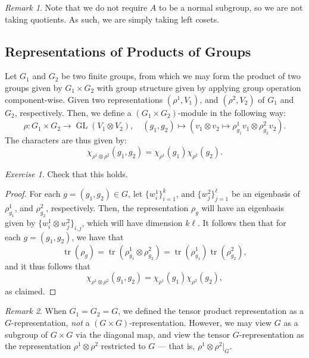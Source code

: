 \documentclass[a4paper]{report}
\theoremstyle{definition}
\theoremstyle{remark}
\newtheorem{remark}{Remark}
\theoremstyle{proposition}
\theoremstyle{conjecture}
\theoremstyle{lemma}
\theoremstyle{corollary}
\theoremstyle{exercise}
\newtheorem{exercise}{Exercise}
\theoremstyle{example}
\newcommand{\on}{\operatorname}
\begin{document}
\begin{remark}
    Note that we do not require $A$ to be a normal subgroup, so we are not
    taking quotients. As such, we are simply taking left cosets.
\end{remark}

\subsection{Representations of Products of Groups}

Let $G_1$ and $G_2$ be two finite groups, from which we may form the 
product of two groups given by $G_1 \times G_2$ with group 
structure given by applying group operation component-wise.
Given two representations $(\rho^1,V_1)$, and $(\rho^2,V_2)$ of 
$G_1$ and $G_2$, respectively. Then, we define a 
$(G_1\times G_2)$-module in the following way:
$$\rho : G_1\times G_2 \longrightarrow \on{GL}(V_1\otimes V_2), \quad (g_1,g_2)\longmapsto \left(v_1 \otimes v_2 \longmapsto \rho^1_{g_1}v_1 \otimes \rho^2_{g_2}v_2\right).$$
The characters are thus given by:
$$\chi_{\rho^1\otimes \rho^2}(g_1,g_2) = \chi_{\rho^1}(g_1) \chi_{\rho^2}(g_2).$$
\begin{exercise}
    Check that this holds.
\end{exercise}

\begin{proof}
    For each $g = (g_1,g_2) \in G$, let 
    $\lbrace w^1_i\rbrace_{i=1}^k$, and $\lbrace w^2_j\rbrace_{j=1}^\ell$ 
    be an eigenbasis of $\rho^1_{g_1}$, and $\rho^2_{g_2}$, respectively.
    Then, the representation $\rho_g$ 
    will have an eigenbasis given by $\lbrace w^1_i\otimes w^2_j\rbrace_{i,j}$,
    which will have dimension $k\ell$. It follows then that for each 
    $g = (g_1,g_2)$, we have that 
    $$\on{tr}(\rho_g) = \on{tr}(\rho^1_{g_1}\otimes\rho^2_{g_2}) = \on{tr}(\rho^1_{g_1})\on{tr}(\rho_{g_2}^2),$$
    and it thus follows that 
    $$\chi_{\rho^1\otimes\rho^2}(g_1,g_2) = \chi_{\rho^1}(g_1)\chi_{\rho^2}(g_2),$$
    as claimed.
\end{proof}

\begin{remark}
    When $G_1=G_2 = G$, we defined the tensor product representation 
    as a $G$-representation, \emph{not} a $(G\times G)$-representation.
    However, we may view $G$ as a subgroup of $G\times G$ via the diagonal 
    map, and view the tensor $G$-representation as the 
    representation $\rho^1\otimes \rho^2$ restricted to $G$ --- that is,
    $\rho^1\otimes\rho^2\vert_G$.
\end{remark}
\end{document}
